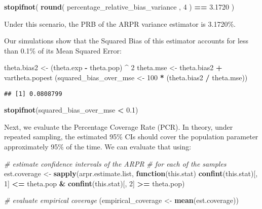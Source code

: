 \documentclass[
]{book}
\newenvironment{Shaded}{\begin{snugshade}}{\end{snugshade}}
\newcommand{\CommentTok}[1]{\textcolor[rgb]{0.56,0.35,0.01}{\textit{#1}}}
\newcommand{\ControlFlowTok}[1]{\textcolor[rgb]{0.13,0.29,0.53}{\textbf{#1}}}
\newcommand{\DecValTok}[1]{\textcolor[rgb]{0.00,0.00,0.81}{#1}}
\newcommand{\FloatTok}[1]{\textcolor[rgb]{0.00,0.00,0.81}{#1}}
\newcommand{\FunctionTok}[1]{\textcolor[rgb]{0.13,0.29,0.53}{\textbf{#1}}}
\newcommand{\NormalTok}[1]{#1}
\newcommand{\OtherTok}[1]{\textcolor[rgb]{0.56,0.35,0.01}{#1}}
\newcommand{\SpecialCharTok}[1]{\textcolor[rgb]{0.81,0.36,0.00}{\textbf{#1}}}
\begin{document}
\begin{Shaded}
\begin{Highlighting}[]
\FunctionTok{stopifnot}\NormalTok{( }\FunctionTok{round}\NormalTok{( percentage\_relative\_bias\_variance , }\DecValTok{4}\NormalTok{ ) }\SpecialCharTok{==} \FloatTok{3.1720}\NormalTok{ ) }
\end{Highlighting}
\end{Shaded}

Under this scenario, the PRB of the ARPR variance estimator is 3.1720\%.

Our simulations show that the Squared Bias of this estimator accounts for less than 0.1\% of its Mean Squared Error:

\begin{Shaded}
\begin{Highlighting}[]
\NormalTok{theta.bias2 }\OtherTok{\textless{}{-}}\NormalTok{ (theta.exp }\SpecialCharTok{{-}}\NormalTok{ theta.pop) }\SpecialCharTok{\^{}} \DecValTok{2}
\NormalTok{theta.mse }\OtherTok{\textless{}{-}}\NormalTok{ theta.bias2 }\SpecialCharTok{+}\NormalTok{ vartheta.popest}
\NormalTok{(squared\_bias\_over\_mse }\OtherTok{\textless{}{-}}  \DecValTok{100} \SpecialCharTok{*}\NormalTok{ (theta.bias2 }\SpecialCharTok{/}\NormalTok{ theta.mse))}
\end{Highlighting}
\end{Shaded}

\begin{verbatim}
## [1] 0.0808799
\end{verbatim}

\begin{Shaded}
\begin{Highlighting}[]
\FunctionTok{stopifnot}\NormalTok{(squared\_bias\_over\_mse }\SpecialCharTok{\textless{}} \FloatTok{0.1}\NormalTok{)}
\end{Highlighting}
\end{Shaded}

Next, we evaluate the Percentage Coverage Rate (PCR). In theory, under repeated sampling, the estimated 95\% CIs should cover the population parameter approximately 95\% of the time. We can evaluate that using:

\begin{Shaded}
\begin{Highlighting}[]
\CommentTok{\# estimate confidence intervals of the ARPR}
\CommentTok{\# for each of the samples}
\NormalTok{est.coverage }\OtherTok{\textless{}{-}}
  \FunctionTok{sapply}\NormalTok{(arpr.estimate.list, }\ControlFlowTok{function}\NormalTok{(this.stat)}
    \FunctionTok{confint}\NormalTok{(this.stat)[, }\DecValTok{1}\NormalTok{] }\SpecialCharTok{\textless{}=}\NormalTok{ theta.pop }\SpecialCharTok{\&}
      \FunctionTok{confint}\NormalTok{(this.stat)[, }\DecValTok{2}\NormalTok{] }\SpecialCharTok{\textgreater{}=}\NormalTok{ theta.pop)}

\CommentTok{\# evaluate empirical coverage}
\NormalTok{(empirical\_coverage }\OtherTok{\textless{}{-}} \FunctionTok{mean}\NormalTok{(est.coverage))}
\end{Highlighting}
\end{Shaded}
\end{document}
